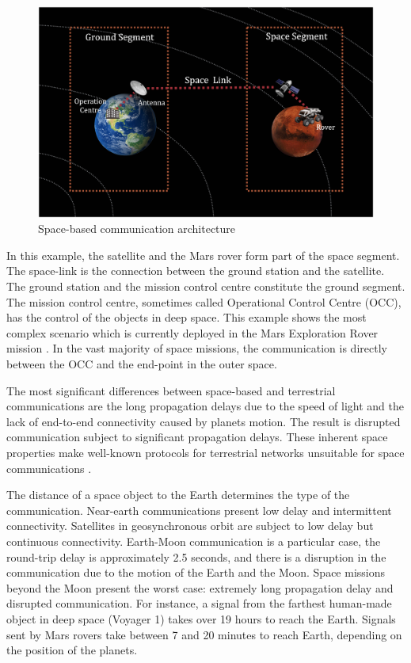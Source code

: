 \begin{figure}[hbt]
\centering
\includegraphics[width=1 \linewidth]{images/ground.png} 
\caption{Space-based communication architecture}
\label{fig:space-based-arc}
\end{figure}

In this example, the satellite and the Mars rover form part of the space segment. The space-link is the connection between the ground station and the satellite.  The ground station and the mission control centre constitute the ground segment. The mission control centre, sometimes called Operational Control Centre (OCC), has the control of the objects in deep space. This example shows the most complex scenario which is currently deployed in the Mars Exploration Rover mission \cite{crisp2003mars}. In the vast majority of space missions, the communication is directly between the OCC and the end-point in the outer space.

 The most significant differences between space-based and terrestrial communications are the long propagation delays due to the speed of light and the lack of end-to-end connectivity caused by planets motion. The result is disrupted communication subject to significant propagation delays. These inherent space properties make well-known protocols for terrestrial networks unsuitable for space communications \cite{fall2003delay}.


The distance of a space object to the Earth determines the type of the communication. Near-earth communications present low delay and intermittent connectivity. Satellites in geosynchronous orbit are subject to low delay but continuous connectivity. Earth-Moon communication is a particular case, the round-trip delay is approximately 2.5 seconds, and there is a disruption in the communication due to the motion of the Earth and the Moon. Space missions beyond the Moon present the worst case: extremely long propagation delay and disrupted communication. For instance,  a signal from the farthest human-made object in deep space (Voyager 1) takes over 19 hours to reach the Earth. Signals sent by Mars rovers take between 7 and 20 minutes to reach Earth, depending on the position of the planets. 



